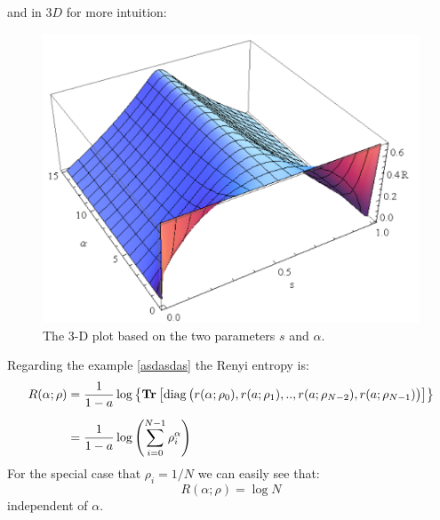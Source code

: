 \begin{itemize}
\begin{figure}[H]
\end{figure}
and in $3D$ for more intuition:
\begin{figure}[H]
\begin{center}
\includegraphics[scale=0.7]{figures/renyi_ent_plot_3D.png}
\caption{The 3-D plot based on the two parameters $s$ and $\alpha$.}
\label{figuridion3d}
\end{center}
\end{figure}
Regarding the example \eqref{asdasdas} the Renyi entropy is: 
\begin{align}
R(\alpha;\rho) &= \frac{1}{1-a} \log \left\{ \operatorname{\textup{\textbf{Tr}}} \left[ \operatorname{diag} \big( r(\alpha;\rho_{0}),r(a;\rho_{1}),..,r(a;\rho_{N-2}),r(a; \rho_{N-1})
 \big) \right] \right\} \\[0.5 em] 
 &=\frac{1}{1-a} \log \left( \sum_{i=0}^{N-1}\rho_{i}^{\alpha} \right)
\end{align}
For the special case that $\rho_{i}=1/N$ we can easily see that:
\begin{equation}
R(\alpha;\rho)=\log N
\end{equation}
independent of $\alpha$.
\end{itemize}